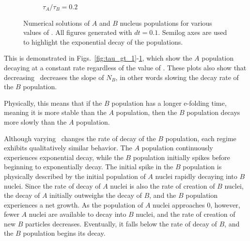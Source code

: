 \documentclass[pra,twocolumn,showpacs,amsmath,amssymb]{revtex4-1}
\begin{document}
\begin{figure}
\begin{subfigure}{.8\linewidth}
     \caption{$\tau_A / \tau_B=0.2$}
     \label{fig:tau_lt_1}
   \end{subfigure}

   \caption{Numerical solutions of $A$ and $B$ nucleus populations for various values of \trel.
   All figures generated with $dt=0.1$. Semilog axes are used to highlight the
   exponential decay of the populations.}
   \label{fig:numerical}
 \end{figure}

This is demonstrated in Figs.~\ref{fig:tau_gt_1}-\ref{fig:tau_lt_1}, which show
the $A$ population decaying at a constant rate regardless of the value of \trel.
These plots also show that decreasing \trel~decreases the slope of $N_B$,
in other words slowing the decay rate of the $B$ population.

Physically, this means that if the $B$ population has a longer e-folding time,
meaning it is more stable than the $A$ population, then the $B$ population decays
more slowly than the $A$ population.

Although varying \trel~changes the rate of decay of the $B$ population, each
regime exhibits qualitatively similar behavior. The $A$ population continuously
experiences exponential decay, while the $B$ population initially spikes before
beginning to exponentially decay. The initial spike in the $B$ population is
physically described by the initial population of $A$ nuclei rapidly decaying
into $B$ nuclei. Since the rate of decay of $A$ nuclei is also the rate of creation
of $B$ nuclei, the decay of $A$ initially outweighs the decay of $B$, and the $B$
population experiences a net growth.
As the population of $A$ nuclei approaches 0, however, fewer $A$ nuclei
are available to decay into $B$ nuclei, and the rate of creation of new $B$
particles decreases. Eventually, it falls below the rate of decay of $B$, and
the $B$ population begins its decay.
\end{document}
